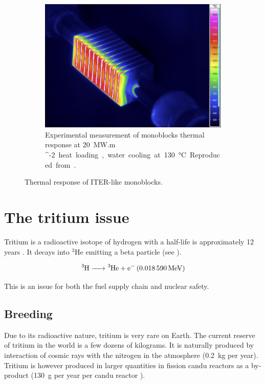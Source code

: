 \begin{figure} [h]
\begin{subfigure}[t]{0.45\linewidth}
            \includegraphics[width=\linewidth]{Figures/Chapter1/monoblock_experimental_temperature_field.png}
            \caption{Experimental measurement of monoblocks thermal response at \SI{20}{MW.m ^{-2}} heat loading, water cooling at \SI{130}{\celsius}. Reproduced from \cite{visca_manufacturing_2018}.}
    \end{subfigure}
    \caption{Thermal response of ITER-like monoblocks.}
\end{figure}

\section{The tritium issue} 

Tritium is a radioactive \gls{isotope} of hydrogen with a half-life is approximately 12 years .
It decays into $^3$He emitting a beta particle (see ).

\begin{equation}
    \ce{^3H -> ^3He + e^- (\SI{0.018590}{MeV})}
    \labeq{tritium decay}
\end{equation}

This is an issue for both the fuel supply chain and nuclear safety.

\subsection{Breeding}
Due to its radioactive nature, tritium is very rare on Earth.
The current reserve of tritium in the world is a few dozens of kilograms.
It is naturally produced by interaction of cosmic rays with the nitrogen in the atmosphere (\SI{0.2}{kg} per year).
Tritium is however produced in larger quantities in fission \gls{candu} reactors as a by-product (\SI{130}{g} per year per \gls{candu} reactor ).

